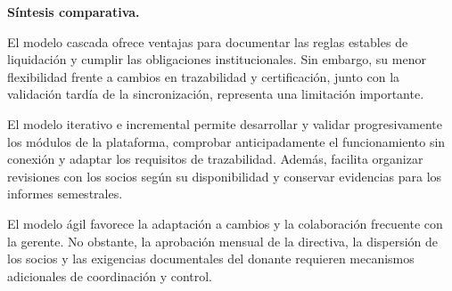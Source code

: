 \normalsize

\noindent\textbf{Síntesis comparativa.}

El modelo cascada ofrece ventajas para documentar las reglas estables de liquidación y cumplir las obligaciones institucionales. Sin embargo, su menor flexibilidad frente a cambios en trazabilidad y certificación, junto con la validación tardía de la sincronización, representa una limitación importante.

El modelo iterativo e incremental permite desarrollar y validar progresivamente los módulos de la plataforma, comprobar anticipadamente el funcionamiento sin conexión y adaptar los requisitos de trazabilidad. Además, facilita organizar revisiones con los socios según su disponibilidad y conservar evidencias para los informes semestrales.

El modelo ágil favorece la adaptación a cambios y la colaboración frecuente con la gerente. No obstante, la aprobación mensual de la directiva, la dispersión de los socios y las exigencias documentales del donante requieren mecanismos adicionales de coordinación y control.
